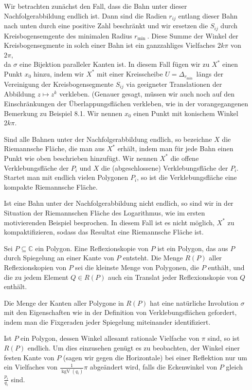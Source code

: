\documentclass[10pt, letterpaper]{article}
\begin{document}
Wir betrachten zunächst den Fall, dass die Bahn unter dieser Nachfolgerabbildung endlich ist. Dann sind die Radien $r_{i j}$ entlang dieser Bahn nach unten durch eine positive Zahl beschränkt und wir ersetzen die $S_{i j}$ durch Kreisbogensemgente des minimalen Radius $r_{\text {min }}$. Diese Summe der Winkel der Kreisbogensegmente in solch einer Bahn ist ein ganzzahliges Vielfaches $2 k \pi$ von $2 \pi$,\\
da $\sigma$ eine Bijektion paralleler Kanten ist. In diesem Fall fügen wir zu $X^{*}$ einen Punkt $x_{0}$ hinzu, indem wir $X^{*}$ mit einer Kreisscheibe $U=\Delta_{r_{\text {min }}}$ längs der Vereinigung der Kreisbogensegmente $S_{i j}$ via geeigneter Translationen der Abbildung $z \mapsto z^{k}$ verkleben. (Genauer gesagt, müssen wir auch noch auf den Einschränkungen der Überlappungsflächen verkleben, wie in der vorangegangenen Bemerkung zu Beispiel 8.1. Wir nennen $x_{0}$ einen Punkt mit konischem Winkel $2 k \pi$.

Sind alle Bahnen unter der Nachfolgerabbildung endlich, so bezeichne $X$ die Riemannsche Fläche, die man aus $X^{*}$ erhält, indem man für jede Bahn einen Punkt wie oben beschrieben hinzufügt. Wir nennen $X^{*}$ die offene Verklebungsfläche der $P_{i}$ und $X$ die (abgeschlossene) Verklebungsfläche der $P_{i}$. Startet man mit endlich vielen Polygonen $P_{i}$, so ist die Verklebungsfläche eine kompakte Riemannsche Fläche.

Ist eine Bahn unter der Nachfolgerabbildung nicht endlich, so sind wir in der Situation der Riemannschen Fläche des Logarithmus, wie im ersten motivierenden Beispiel besprochen. In diesem Fall ist es nicht möglich, $X^{*}$ zu kompaktifizieren, sodass das Resultat eine Riemannsche Fläche ist.

Sei $P \subseteq \mathbb{C}$ ein Polygon. Eine Reflexionskopie von $P$ ist ein Polygon, das aus $P$ durch Spiegelung an einer Kante von $P$ entsteht. Die Menge $R(P)$ aller Reflexionskopien von $P$ sei die kleinste Menge von Polygonen, die $P$ enthält, und die zu jedem Element $Q \in R(P)$ auch ein Translat jeder Reflexionskopie von $Q$ enthält.

Die Menge der Kanten aller Polygone in $R(P)$ hat eine natürliche Involution $\sigma$ mit den Eigenschaften wie in der Definition von Verklebungsflächen gefordert, indem man die Fixgeraden jeder Spiegelung miteinander identifiziert.

Ist $P$ ein Polygon, dessen Winkel allesamt rationale Vielfache von $\pi$ sind, so ist $R(P)$ endlich. Um dies einzusehen genügt es zu beobachten, der Winkel einer festen Kante von $P$ (sagen wir gegen die Horizontale) bei einer Reflektion nur um ein Vielfaches von $\frac{1}{\operatorname{kgV}\left(q_{i}\right)} \pi$ abgeändert wird, falls die Eckenwinkel von $P$ gleich $\frac{p_{i}}{q_{i}}$ sind.
\end{document}
